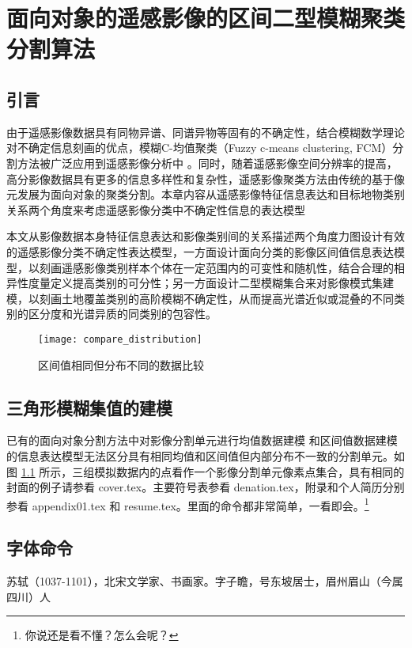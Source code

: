 
\chapter{面向对象的遥感影像的区间二型模糊聚类分割算法}
\label{cha:chap03}

\section{引言}
\label{sec:chap03-1}
由于遥感影像数据具有同物异谱、同谱异物等固有的不确定性，结合模糊数学理论对不确定信息刻画的优点，模糊C-均值聚类（Fuzzy c-means clustering, FCM）分割方法被广泛应用到遥感影像分析中 \cite{bezdek1984fcm}。同时，随着遥感影像空间分辨率的提高，高分影像数据具有更多的信息多样性和复杂性，遥感影像聚类方法由传统的基于像元发展为面向对象的聚类分割。本章内容从遥感影像特征信息表达和目标地物类别关系两个角度来考虑遥感影像分类中不确定性信息的表达模型


本文从影像数据本身特征信息表达和影像类别间的关系描述两个角度力图设计有效的遥感影像分类不确定性表达模型，一方面设计面向分类的影像区间值信息表达模型，以刻画遥感影像类别样本个体在一定范围内的可变性和随机性，结合合理的相异性度量定义提高类别的可分性；另一方面设计二型模糊集合来对影像模式集建模，以刻画土地覆盖类别的高阶模糊不确定性，从而提高光谱近似或混叠的不同类别的区分度和光谱异质的同类别的包容性。

\begin{figure}[!htb] %
    \centering
    \texttt{[image: compare\_distribution]}
    \caption{区间值相同但分布不同的数据比较}
    \label{fig:compare_distribution}
  \end{figure}

\section{三角形模糊集值的建模}
\label{sec:chap03-2}
已有的面向对象分割方法中对影像分割单元进行均值数据建模 \cite{yu2012method} 和区间值数据建模 \cite{he2016remote} 的信息表达模型无法区分具有相同均值和区间值但内部分布不一致的分割单元。如图 \ref{fig:compare_distribution} 所示，三组模拟数据内的点看作一个影像分割单元像素点集合，具有相同的
封面的例子请参看 cover.tex。主要符号表参看 denation.tex，附录和个人简历分别参看 appendix01.tex
和 resume.tex。里面的命令都非常简单，一看即会。\footnote{你说还是看不懂？怎么会呢？}

\section{字体命令}
\label{sec:first}

苏轼（1037-1101），北宋文学家、书画家。字子瞻，号东坡居士，眉州眉山（今属四川）人
